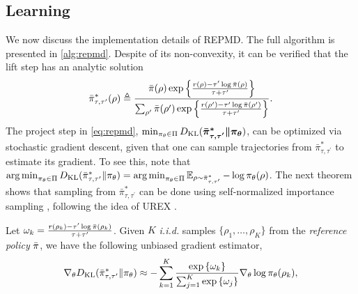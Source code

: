 \subsection{Learning }
\label{subsec:learning}
We now discuss the implementation details of REPMD. The full algorithm is presented in \cref{alg:repmd}.
Despite of its non-convexity, it can be verified that the lift step has an analytic solution
\begin{equation}
\label{eq:pitautauprime}
\bar{\pi}_{\tau,\tau^{\prime}}^*(\rho) \triangleq \frac{\bar{\pi}(\rho) \exp\left\{ \frac{r(\rho)-\tau^{\prime} \log \bar{\pi}(\rho) }{ \tau+\tau^{\prime}} \right\}}{ \sum_{\rho^{\prime}}{\bar{\pi}(\rho^{\prime}) \exp\left\{ \frac{r(\rho^{\prime})-\tau^{\prime} \log \bar{\pi}(\rho^{\prime})}{ \tau+\tau^{\prime}} \right\} } }.
\end{equation}
The project step in \cref{eq:repmd}, $\min\nolimits_{\pi_\theta \in \Pi}{D_{\mathrm{KL}}(\bm{ \bar{\pi}_{\tau,\tau^{\prime}}^* \| \pi_\theta }) }$, can be optimized via stochastic gradient descent, given that one can sample trajectories from $\bar{\pi}_{\tau,\tau^{\prime}}^*$ to estimate its gradient. To see this, note that $\operatorname*{arg\,min}\nolimits_{\pi_\theta \in \Pi}D_{\mathrm{KL}}(\bar{\pi}_{\tau,\tau^{\prime}}^* \| \pi_\theta) = \operatorname*{arg\,min}\nolimits_{\pi_\theta \in \Pi} \operatorname*{\mathbb{E}}_{\rho \sim \bar{\pi}_{\tau,\tau^{\prime}}^* }  - \log \pi_\theta(\rho)$. The next theorem shows that sampling from $\bar{\pi}_{\tau,\tau^{\prime}}^*$ can be done using self-normalized importance sampling \citep{owen2013monte}, following the idea of UREX \citep{nachum2017improving}.
\begin{thm}
\label{thm:repmdgradientestimate}
Let $\omega_k = \frac{r(\rho_k) - \tau^{\prime} \log{\bar{\pi}(\rho_k)} }{\tau + \tau^{\prime}}$. Given $K$ \emph{i.i.d.} samples $\{\rho_1, \dots, \rho_K\}$ from the \emph{reference policy} $\bar{\pi}$, we have the following unbiased gradient estimator,
\begin{equation}
\label{eq:gradient_estimator}
	\nabla_{\theta} D_{\mathrm{KL}}(\bar{\pi}_{\tau,\tau^{\prime}}^* \| \pi_\theta)\approx -\sum\limits_{k=1}^K{ \frac{ \exp\left\{ \omega_k \right\} }{ \sum_{j=1}^K{ \exp\left\{ \omega_j \right\}}} \nabla_{\theta} \log{\pi_\theta(\rho_k)} },
\end{equation}
\end{thm}














